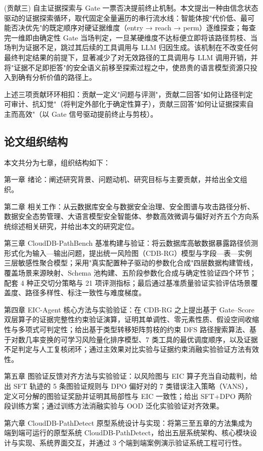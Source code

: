 \documentclass[a4paper,12pt]{ctexart}
\begin{document}
(贡献三) 自主证据探索与 Gate 一票否决提前终止机制。本文提出一种由信念状态驱动的证据探索循环，取代固定全量遍历的串行流水线：智能体按"代价低、最可能否决优先"的既定顺序对硬证据维度（entry → reach → perm）逐维探查；每查完一维即由确定性 Gate 当场判定，一旦某硬维度不达标便立即将该路径剪枝、当场判为证据不足，跳过其后续的工具调用与 LLM 归因生成。该机制在不改变任何最终判定结果的前提下，显著减少了对无效路径的工具调用与 LLM 调用开销，并将"证据不足即拒答"的安全语义前移至探索过程之中，使昂贵的语言模型资源只投入到确有分析价值的路径上。

上述三项贡献环环相扣：贡献一定义"问题与评测"，贡献二回答"如何让路径判定可审计、抗幻觉"（将判定外部化于确定性算子），贡献三回答"如何让证据探索自主而高效"（以 Gate 信号驱动提前终止与剪枝）。

\subsection{论文组织结构}

本文共分为七章，组织结构如下：

第一章 绪论：阐述研究背景、问题动机、研究目标与主要贡献，并给出全文组织。

第二章 相关工作：从云数据库安全与数据安全治理、安全图谱与攻击路径分析、数据安全态势管理、大语言模型安全智能体、参数高效微调与偏好对齐五个方向系统综述相关研究，并给出本文的研究定位。

第三章 CloudDB-PathBench 基准构建与验证：将云数据库高敏数据暴露路径侦测形式化为输入—输出问题，提出统一风险图（CDB-RG）模型与字段—表—实例三层敏感性聚合模型；采用"真实配置种子驱动的参数化合成"四层数据构建管线，覆盖场景来源映射、Schema 池构建、五阶段参数化合成与确定性验证四个环节；配套 4 种正交切分策略与 21 项评测指标；最后通过基准质量验证实验评估场景覆盖度、路径多样性、标注一致性与难度梯度。

第四章 EIC-Agent 核心方法与实验验证：在 CDB-RG 之上提出基于 Gate–Score 双层算子的证据完整性约束验证演算，证明其单调性、零元素性质、假设空间收缩性与多项式可判定性；给出基于类型转移矩阵剪枝的约束 DFS 路径搜索算法、基于对数几率变换的可学习风险量化排序模型、7 类工具的最优调度顺序，以及证据不足判定与人工复核闭环；通过主效果对比实验与证据约束消融实验验证方法有效性。

第五章 图验证反馈对齐方法与实验验证：以风险图与 EIC 算子充当自动裁判，给出 SFT 轨迹的 5 条图验证规则与 DPO 偏好对的 7 类错误注入策略（VANS），定义可分解的图验证奖励并证明其局部性与 EIC 一致性；给出 SFT+DPO 两阶段训练方案；通过训练方法消融实验与 OOD 泛化实验验证对齐效果。

第六章 CloudDB-PathDetect 原型系统设计与实现：将第三至五章的方法集成为端到端可运行的原型系统 CloudDB-PathDetect，给出五层系统架构、核心模块设计与实现、系统界面交互，并通过 3 个端到端案例演示验证系统工程可行性。
\end{document}

